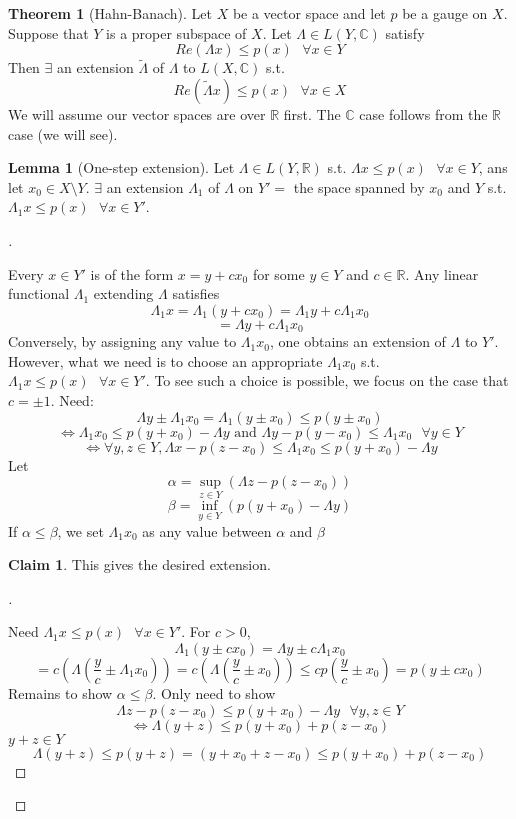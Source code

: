 \documentclass{article}
\newcommand{\sfa}{\text{  } \forall}
\theoremstyle{definition}
\newtheorem{thm}{Theorem}
\newtheorem{lem}{Lemma}
\newtheorem*{clm}{Claim}
\newenvironment{proofs}[1][\proofname]{%
  \begin{proof}[#1]$ $\par\nobreak\ignorespaces
}{%
  \end{proof}
}
\begin{document}
\begin{thm}[Hahn-Banach]
	Let $X$ be a vector space and let $p$ be a gauge on $X$. 
	Suppose that $Y$ is a proper subspace of $X$.
	Let $\Lambda \in L(Y, \mathbb{C})$ satisfy
	\[
		Re(\Lambda x) \leq p(x) \sfa x \in Y
	\]
	Then $\exists$ an extension $\tilde{\Lambda}$ of $\Lambda$ to $L(X, \mathbb{C})$ s.t.
	\[
		Re(\tilde{\Lambda} x) \leq p(x) \sfa x \in X
	\]
	We will assume our vector spaces are over $\mathbb{R}$ first.
	The $\mathbb{C}$ case follows from the $\mathbb{R}$ case (we will see).
\end{thm}

\begin{lem}[One-step extension]
	Let $\Lambda \in L(Y, \mathbb{R})$ s.t. $\Lambda x \leq p(x) \sfa x \in Y$, ans let $x_0 \in X \setminus Y$. $\exists$ an extension $\Lambda_1$ of $\Lambda$ on $Y' =$ the space spanned by $x_0$ and $Y$ s.t. $\Lambda_1 x \leq p(x) \sfa x \in Y'$.
\end{lem}

\begin{proofs}
	Every $x \in Y'$ is of the form $x = y + c x_0$ for some $y \in Y$ and $c \in \mathbb{R}$. Any linear functional $\Lambda_1$ extending $\Lambda$ satisfies
	\[
		\Lambda_1 x = \Lambda_1 (y + c x_0) = \Lambda_1 y + c \Lambda_1 x_0
	\]
	\[
		= \Lambda y + c \Lambda_1 x_0
	\]
	Conversely, by assigning any value to $\Lambda_1 x_0$, one obtains an extension of $\Lambda$ to $Y'$. However, what we need is to choose an appropriate $\Lambda_1 x_0$ s.t. $\Lambda_1 x \leq p(x) \sfa x \in Y'$. To see such a choice is possible, we focus on the case that $c = \pm 1$.
	Need:
	\[
		\Lambda y \pm \Lambda_1 x_0 = \Lambda_1(y \pm x_0) \leq p(y \pm x_0) 
	\]
	\[
		\Leftrightarrow \Lambda_1 x_0 \leq p(y + x_0) - \Lambda y \text{ and } \Lambda y - p(y - x_0) \leq \Lambda_1 x_0 \sfa y \in Y
	\]
	\[
		\Leftrightarrow \forall y, z \in Y, \Lambda x - p(z - x_0) \leq \Lambda_1 x_0 \leq p(y + x_0) - \Lambda y
	\]
	Let 
	\[
		\alpha = \sup_{z \in Y} (\Lambda z - p(z - x_0))
	\]
	\[
		\beta = \inf_{y \in Y} (p(y + x_0) - \Lambda y)
	\]
	If $\alpha \leq \beta$, we set $\Lambda_1 x_0$ as any value between $\alpha$ and $\beta$
	\begin{clm}
		This gives the desired extension.
	\end{clm}

	\begin{proofs}
		Need $\Lambda_1 x \leq p(x) \sfa x \in Y'$.
		For $c > 0$, 
		\[
			\Lambda_1 (y \pm c x_0) = \Lambda y \pm c \Lambda_1x_0
		\]
		\[
			= c\left( \Lambda \left(\frac{y}{c} \pm \Lambda_1 x_0 \right) \right) = c\left(\Lambda \left(\frac{y}{c} \pm x_0\right) \right) \leq c p\left(\frac{y}{c} \pm x_0\right) = p(y \pm c x_0)
		\]
		Remains to show $\alpha \leq \beta$.
		Only need to show 
		\[
			\Lambda z - p(z - x_0) \leq p(y + x_0) - \Lambda y \sfa y, z \in Y
		\]
		\[
			\Leftrightarrow \Lambda (y + z) \leq p (y + x_0) + p(z - x_0)
		\]
		$y + z \in Y$
		\[
			\Lambda (y + z) \leq p (y + z) = (y + x_0 + z - x_0) \leq p(y + x_0) + p(z - x_0)
		\]
	\end{proofs}

\end{proofs}
\end{document}
